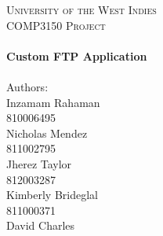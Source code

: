 \begin{titlepage}

    \begin{center}

        \textsc{\LARGE University of the West Indies}\\[1.5cm]

        \textsc{\large COMP3150 Project}\\[0.5cm]
        
        \HRule \\[0.4cm]
            { \huge \bfseries Custom FTP Application \\[0.4cm] }
        \HRule \\[1.5cm]

    
        Authors:\\[0.6cm]
        Inzamam Rahaman\\[0.2cm]
        810006495\\[0.7cm]
        Nicholas Mendez\\[0.2cm]
        811002795\\[0.7cm]
        Jherez Taylor\\[0.2cm]
        812003287\\[0.7cm]
        Kimberly Brideglal\\[0.2cm]
        811000371\\[0.7cm]
        David Charles 
     
    \end{center}
    
    
    
    
    \vfill
    
    
    
    
    
    

\end{titlepage}